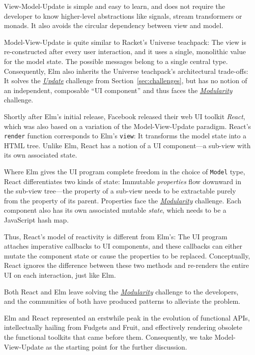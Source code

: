 \documentclass[sigplan,screen]{acmart}
\begin{document}
View-Model-Update is simple and easy to
learn, and does not require the developer to know higher-level
abstractions like signals, stream transformers or monads.  It also
avoids the circular dependency between view and model.

Model-View-Update is quite similar to Racket's
Universe teachpack: The view is re-constructed after every user
interaction, and it uses a single, monolithic value for the model
state.  The possible messages belong to a
single central type.
Consequently, Elm also inherits the Universe teachpack's architectural
trade-offs: It solves the \hyperlink{challenge:update}{\textit{Update}} challenge from Section~\ref{sec:challenges},
but has no notion of an
independent, composable ``UI component'' and thus faces the
\hyperlink{challenge:modularity}{\textit{Modularity}} challenge.

Shortly after Elm's initial release, Facebook released their web UI
toolkit \textit{React}, which was also based on a variation of the
Model-View-Update paradigm.
React's \texttt{render} function corresponds to Elm's \texttt{view}:
It transforms the model state into a HTML tree.  Unlike Elm,
React has a notion of a UI component---a sub-view with its
own associated state.

Where Elm gives the UI program complete freedom in the choice of
\texttt{Model} type, React differentiates two kinds of state:
Immutable \textit{properties} flow downward in the sub-view
tree---the property of a sub-view needs to be extractable purely from the
property of its parent.  Properties face the
\hyperlink{challenge:modularity}{\textit{Modularity}} challenge.
Each component also has its own associated mutable \textit{state},
which needs to be a JavaScript hash map.

Thus, React's model of reactivity is different from Elm's: The UI
program attaches imperative callbacks to UI components, and these
callbacks can either mutate the component state or cause the
properties to be replaced.  Conceptually, React ignores the difference
between these two methods and re-renders the entire UI on each
interaction, just like Elm.

Both React and Elm leave solving the
\hyperlink{challenge:modularity}{\textit{Modularity}} challenge to the
developers, and the communities of both have produced patterns to
alleviate the problem.


Elm and React represented an erstwhile peak in the evolution of
functional APIs, intellectually hailing from Fudgets and Fruit, and
effectively rendering obsolete the functional toolkits that came
before them.
Consequently, we
take Model-View-Update as the starting point for the further
discussion.
\end{document}
